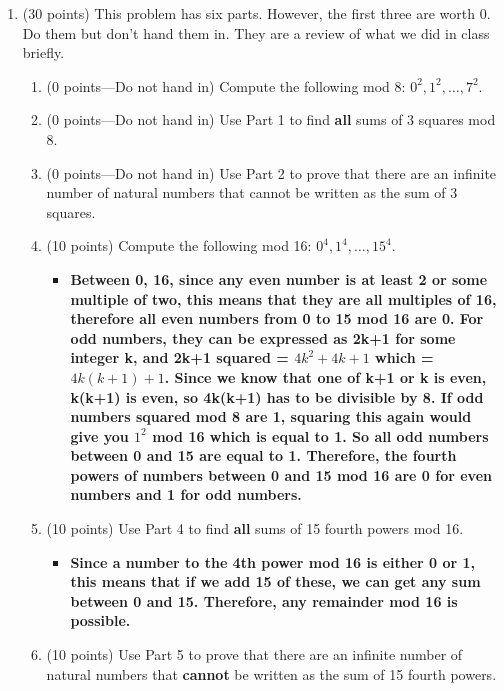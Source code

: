 \documentclass[12pt]{article}
\begin{document}
\begin{enumerate}
\item
(30 points) 
This problem has six parts.
However, the first three are worth 0.
Do them but don't hand them in.
They are a review of what we did in class briefly. 
\begin{enumerate}
\item
(0 points---Do not hand in)
Compute the following mod 8: 
$0^2, 1^2,\ldots, 7^2$.
\item 
(0 points---Do not hand in)
Use Part 1 to find {\bf all} sums of 3 squares mod 8. 
\item
(0 points---Do not hand in)
Use Part 2 to 
prove that there are an infinite number of
natural numbers that cannot be written as
the sum of 3 squares.
\item
(10 points) 
Compute the following mod 16: 
$0^4, 1^4,\ldots, 15^4$.
\begin{itemize}
    \item \textbf{Between 0, 16, since any even number is at least 2 or some multiple of two, this means that they are all multiples of 16, therefore all even numbers from 0 to 15 mod 16 are 0. For odd numbers, they can be expressed as 2k+1 for some integer k, and 2k+1 squared = $4k^2 + 4k + 1$ which = $4k(k+1) + 1$. Since we know that one of k+1 or k is even, k(k+1) is even, so 4k(k+1) has to be divisible by 8. If odd numbers squared mod 8 are 1, squaring this again would give you $1^2$ mod 16 which is equal to 1. So all odd numbers between 0 and 15 are equal to 1. Therefore, the fourth powers of numbers between 0 and 15 mod 16 are 0 for even numbers and 1 for odd numbers.} 
\end{itemize}
\item
(10 points) 
Use Part 4 to find {\bf all} sums of 15 fourth powers mod 16. 
\begin{itemize}
    \item \textbf{Since a number to the 4th power mod 16 is either 0 or 1, this means that if we add 15 of these, we can get any sum between 0 and 15. Therefore, any remainder mod 16 is possible. }
\end{itemize}
\item
(10 points) 
Use Part 5 to
prove that there are an infinite number of
natural numbers that {\bf cannot} be written as
the sum of 15 fourth powers.
\begin{itemize}

\end{itemize}
\end{enumerate}
\end{enumerate}
\end{document}
